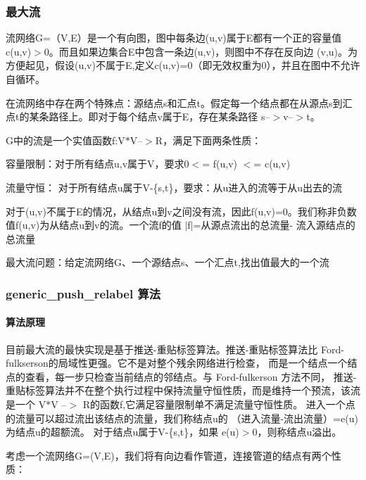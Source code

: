 \subsubsection*{最大流}

流网络\+G=（\+V,E）是一个有向图，图中每条边(u,v)属于\+E都有一个正的容量值c(u,v)$>$0。而且如果边集合\+E中包含一条边(u,v)，则图中不存在反向边 (v,u)。为方便起见，假设(u,v)不属于\+E,定义c(u,v)=0（即无效权重为0），并且在图中不允许自循环。

在流网络中存在两个特殊点：源结点s和汇点t。假定每一个结点都在从源点s到汇点t的某条路径上。即对于每个结点v属于\+E，存在某条路径 s--$>$v--$>$t。

G中的流是一个实值函数f\+:V$\ast$\+V--$>$R，满足下面两条性质：


\begin{DoxyItemize}
\item 容量限制：对于所有结点u,v属于\+V，要求0$<$= f(u,v) $<$= c(u,v)
\item 流量守恒： 对于所有结点u属于\+V-\/\{s,t\}，要求：从u进入的流等于从u出去的流
\end{DoxyItemize}

对于(u,v)不属于\+E的情况，从结点u到v之间没有流，因此f(u,v)=0。我们称非负数值f(u,v)为从结点u到v的流。一个流f的值 $\vert$f$\vert$=从源点流出的总流量-\/ 流入源结点的总流量

最大流问题：给定流网络\+G、一个源结点s、一个汇点t,找出值最大的一个流

\subsubsection*{generic\+\_\+push\+\_\+relabel 算法}

\paragraph*{算法原理}

目前最大流的最快实现是基于推送-\/重贴标签算法。推送-\/重贴标签算法比 Ford-\/fulkserson的局域性更强。它不是对整个残余网络进行检查， 而是一个结点一个结点的查看，每一步只检查当前结点的邻结点。与 Ford-\/fulkerson 方法不同， 推送-\/重贴标签算法并不在整个执行过程中保持流量守恒性质，而是维持一个预流，该流是一个 V$\ast$\+V --$>$ R的函数f,它满足容量限制单不满足流量守恒性质。 进入一个点的流量可以超过流出该结点的流量，我们称结点u的 （进入流量-\/流出流量）=e(u)为结点u的超额流。 对于结点u属于\+V-\/\{s,t\}，如果 e(u)$>$0，则称结点u溢出。

考虑一个流网络\+G=(V,E)，我们将有向边看作管道，连接管道的结点有两个性质：


